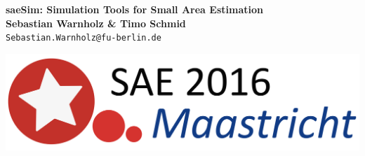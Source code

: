\documentclass[a0,portrait]{a0poster}\usepackage[]{graphicx}\usepackage[]{color}
\begin{document}


\begin{minipage}[b]{0.75\linewidth}
\Huge \color{NavyBlue} \textbf{saeSim: Simulation Tools for Small Area Estimation} \color{Black}\\[0.5cm] %
\huge \textbf{ Sebastian Warnholz \& Timo Schmid }\\[0.5cm] %
\Large \texttt{Sebastian.Warnholz@fu-berlin.de} \\
\end{minipage}
%
\begin{minipage}[b]{0.25\linewidth}
\hfill\includegraphics[width=1\linewidth]{logo.png}\\
\end{minipage}

\vspace{1cm} %

\end{document}

